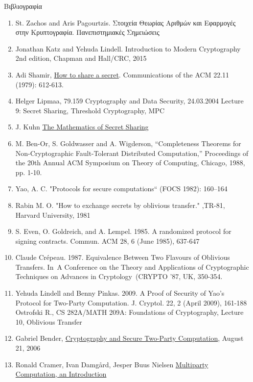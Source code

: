 \documentclass[handout]{beamer}
\begin{document}
\begin{frame}[allowframebreaks]{Βιβλιογραφία}

\begin{tiny}
\begin{enumerate}
\item St. Zachos and Aris Pagourtzis. Στοιχεία Θεωρίας Αριθμών και Εφαρμογές στην Κρυπτογραφία. Πανεπιστημιακές Σημειώσεις
\item Jonathan Katz and Yehuda Lindell. Introduction to Modern Cryptography 2nd edition,  Chapman and Hall/CRC, 2015
\item Adi Shamir, \href{http://www5.in.tum.de/lehre/vorlesungen/konkr_math/WS_10_11/prog/shamir.pdf}{How to share a secret}.  Communications of the ACM 22.11 (1979): 612-613.
\item Helger Lipmaa, 79.159 Cryptography and Data Security, 24.03.2004 Lecture 9: Secret Sharing, Threshold Cryptography, MPC 
\item J. Kuhn \href{https://jeremykun.com/2014/06/23/the-mathematics-of-secret-sharing/}{The Mathematics of Secret Sharing}
\item M. Ben-Or, S. Goldwasser and A. Wigderson, “Completeness Theorems for Non-Cryptographic Fault-Tolerant Distributed Computation,” Proceedings of the 20th Annual ACM Symposium on Theory of Computing, Chicago, 1988, pp. 1-10.
\item Yao, A. C.  "Protocols for secure computations“ (FOCS 1982): 160–164
\item Rabin M. O. "How to exchange secrets by oblivious transfer." ,TR-81, Harvard University, 1981
\item S. Even, O. Goldreich, and A. Lempel. 1985. A randomized protocol for signing contracts. Commun. ACM 28, 6 (June 1985), 637-647
\item Claude Crépeau. 1987. Equivalence Between Two Flavours of Oblivious Transfers. In A Conference on the Theory and Applications of Cryptographic Techniques on Advances in Cryptology (CRYPTO '87, UK, 350-354.
\item Yehuda Lindell and Benny Pinkas. 2009. A Proof of Security of Yao’s Protocol for Two-Party Computation. J. Cryptol. 22, 2 (April 2009), 161-188
Ostrofski R., CS 282A/MATH 209A: Foundations of Cryptography, Lecture 10, Oblivious Transfer
\item Gabriel Bender, \href{http://www.math.uchicago.edu/~may/VIGRE/VIGRE2006/PAPERS/Bender.pdf}{Cryptography and Secure Two-Party Computation}, August 21, 2006
\item Ronald Cramer, Ivan Damgård, Jesper Buus Nielsen \href{https://pdfs.semanticscholar.org/6ae2/38ab990dd0c97fa972dc6087da7aaece4279.pdf}{Multiparty Computation, an Introduction} 
\end{enumerate}
\end{tiny}
\end{frame}
\end{document}
